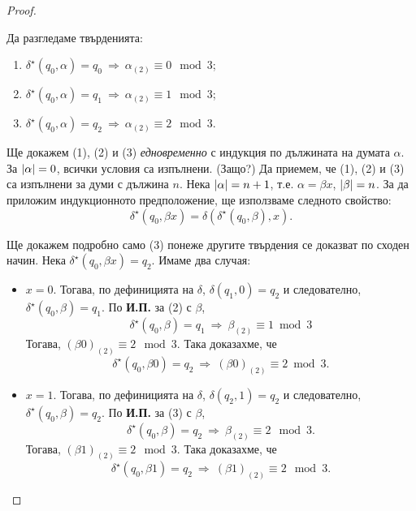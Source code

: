 \begin{proof}
\begin{figure}[H]
\begin{center}
      \end{center}
 \end{figure}
  Да разгледаме твърденията:
  \begin{enumerate}[(1)]
  \item 
    $\delta^\star(q_0,\alpha) = q_0\ \Rightarrow\ \alpha_{(2)} \equiv 0 \mod 3$;
  \item 
    $\delta^\star(q_0,\alpha) = q_1\ \Rightarrow\ \alpha_{(2)} \equiv 1 \mod 3$;
  \item 
    $\delta^\star(q_0,\alpha) = q_2\ \Rightarrow\ \alpha_{(2)} \equiv 2 \mod 3$.
  \end{enumerate}
  Ще докажем (1), (2) и (3) {\em едновременно} с индукция по дължината на думата $\alpha$.
  За $\lvert{\alpha}\rvert = 0$, всички условия са изпълнени. (Защо?)
  Да приемем, че (1), (2) и (3) са изпълнени за думи с дължина $n$.
  Нека $\lvert{\alpha}\rvert = n+1$, т.е. $\alpha = \beta x$, $\lvert{\beta}\rvert = n$.
  За да приложим индукционното предположение, ще използваме следното свойство:
  \[\delta^\star(q_0,\beta x) = \delta(\delta^\star(q_0,\beta),x).\]
  
  Ще докажем подробно само (3) понеже другите твърдения се доказват по сходен начин.
  Нека $\delta^\star(q_0,\beta x) = q_2$. 
  Имаме два случая:
  \begin{itemize}
  \item 
    $x = 0$. 
    Тогава, по дефиницията на $\delta$, 
    $\delta(q_1,0) = q_2$ и следователно, $\delta^\star(q_0,\beta) = q_1$.
    По {\bf И.П.} за (2) с $\beta$,
    \[\delta^\star(q_0,\beta) = q_1\ \Rightarrow\ \beta_{(2)} \equiv 1 \bmod 3\]
    Тогава, $(\beta0)_{(2)} \equiv 2 \mod 3$. Така доказахме, че
    \[\delta^\star(q_0,\beta 0) = q_2\ \Rightarrow\ (\beta 0)_{(2)} \equiv 2 \bmod 3.\]
  \item
    $x = 1$.
    Тогава, по дефиницията на $\delta$, $\delta(q_2,1) = q_2$ и следователно,
    $\delta^\star(q_0,\beta) = q_2$.
    По {\bf И.П.} за (3) с $\beta$,
    \[\delta^\star(q_0,\beta) = q_2\ \Rightarrow\ \beta_{(2)} \equiv 2 \mod 3.\]
    Тогава, $(\beta1)_{(2)} \equiv 2 \mod 3$. Така доказахме, че
    \[\delta^\star(q_0,\beta 1) = q_2\ \Rightarrow\ (\beta 1)_{(2)} \equiv 2 \mod 3.\]
  \end{itemize}
  

\end{proof}
